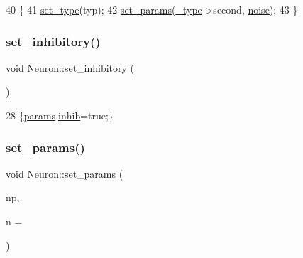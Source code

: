 \begin{DoxyCode}
40                                                                         \{
41     \hyperlink{classNeuron_a533359bca915ef99c96e50d4bfff58b2}{set\_type}(typ);
42     \hyperlink{classNeuron_a85049e5f8745c53867178dd1cf6e51e3}{set\_params}(\hyperlink{classNeuron_af48de7c2ad739fc5d57bfa2f3b1f7663}{\_type}->second, \hyperlink{test__main_8cpp_aedb3acb007b8cca8efc63eed08f45705}{noise});
43 \}
\end{DoxyCode}
\mbox{\label{classNeuron_aa1481c474df55ad14373e51c6bb0f6fd}} 
\subsubsection{\texorpdfstring{set\+\_\+inhibitory()}{set\_inhibitory()}}
{\footnotesize\ttfamily void Neuron\+::set\+\_\+inhibitory (\begin{DoxyParamCaption}{ }\end{DoxyParamCaption})\hspace{0.3cm}{\ttfamily [inline]}}


\begin{DoxyCode}
28 \{\hyperlink{classNeuron_a9427965b6669c7c35c327689de7a4d63}{params}.\hyperlink{structNeuronParams_a751856d77a821cbd361b774d8653bbe6}{inhib}=\textcolor{keyword}{true};\}
\end{DoxyCode}
\mbox{\label{classNeuron_a85049e5f8745c53867178dd1cf6e51e3}} 
\subsubsection{\texorpdfstring{set\+\_\+params()}{set\_params()}}
{\footnotesize\ttfamily void Neuron\+::set\+\_\+params (\begin{DoxyParamCaption}\item[{const \hyperlink{structNeuronParams}{Neuron\+Params} \&}]{np,  }\item[{const double}]{n = {} }\end{DoxyParamCaption})}


